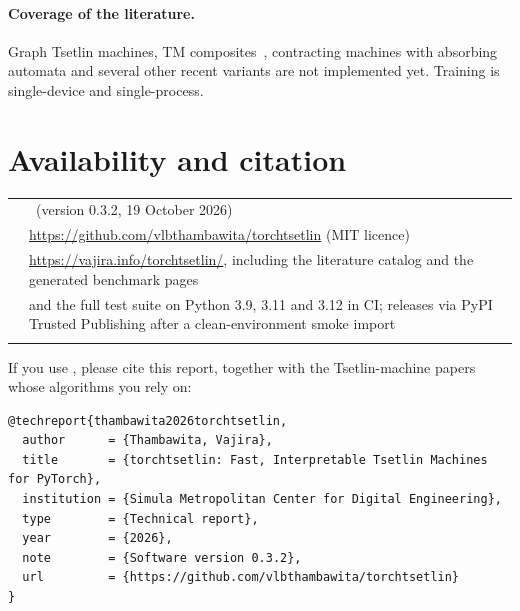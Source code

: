 \documentclass[10.5pt,a4paper]{article}
\newcommand{\ttversion}{0.3.2}
\newcommand{\ttdate}{19 October 2026}
\begin{document}
\paragraph{Coverage of the literature.} Graph Tsetlin machines, TM composites~, contracting
machines with absorbing automata and several other recent variants are not implemented yet.
Training is single-device and single-process.

\section{Availability and citation}

\begin{center}
\small\sffamily\sloppy
\begin{tabularx}{\linewidth}{@{}L{2.6cm}>{\raggedright\arraybackslash}X@{}}
\ttoprule
{} &  \ (version \ttversion, \ttdate)\\
 & \url{https://github.com/vlbthambawita/torchtsetlin} (MIT licence)\\
 & \url{https://vajira.info/torchtsetlin/}, including the literature
  catalog and the generated benchmark pages\\
 &  and the full test suite on Python 3.9, 3.11 and 3.12 in CI;
  releases via PyPI Trusted Publishing after a clean-environment smoke import\\
\ttbotrule
\end{tabularx}
\end{center}

If you use \ttlibname, please cite this report, together with the Tsetlin-machine papers whose
algorithms you rely on:

\begin{lstlisting}[style=ttshell,basicstyle=\ttfamily\scriptsize\color{ttink}]
@techreport{thambawita2026torchtsetlin,
  author      = {Thambawita, Vajira},
  title       = {torchtsetlin: Fast, Interpretable Tsetlin Machines for PyTorch},
  institution = {Simula Metropolitan Center for Digital Engineering},
  type        = {Technical report},
  year        = {2026},
  note        = {Software version 0.3.2},
  url         = {https://github.com/vlbthambawita/torchtsetlin}
}
\end{lstlisting}
\end{document}
